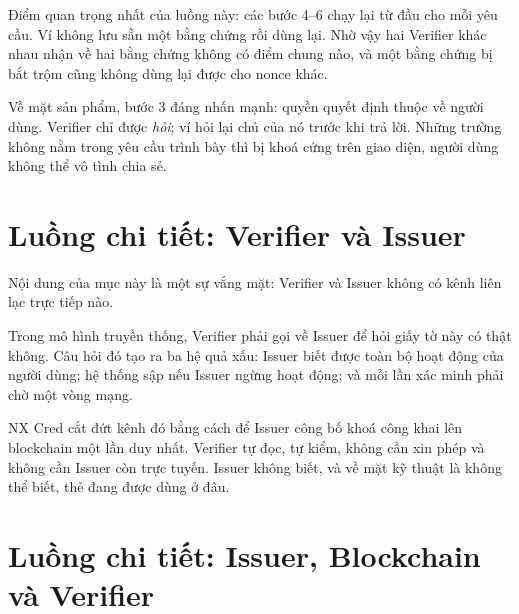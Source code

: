 \documentclass[a4paper,11pt,oneside]{report}
\theoremstyle{definition}
\theoremstyle{plain}
\begin{document}
Điểm quan trọng nhất của luồng này: các bước 4--6 chạy lại từ đầu cho mỗi yêu cầu. Ví không lưu
sẵn một bằng chứng rồi dùng lại. Nhờ vậy hai Verifier khác nhau nhận về hai bằng
chứng không có điểm chung nào, và một bằng chứng bị bắt trộm cũng không dùng lại được cho
nonce khác.

Về mặt sản phẩm, bước 3 đáng nhấn mạnh: quyền quyết định thuộc về người dùng. Verifier chỉ được
\emph{hỏi}; ví hỏi lại chủ của nó trước khi trả lời. Những trường không nằm trong
yêu cầu trình bày thì bị khoá cứng trên giao diện, người dùng không thể vô tình chia
sẻ.

\section{Luồng chi tiết: Verifier và Issuer}
\label{sec:flow-vi}

Nội dung của mục này là một sự vắng mặt: Verifier và Issuer không có
kênh liên lạc trực tiếp nào.

\begin{center}
\end{center}

Trong mô hình truyền thống, Verifier phải gọi về Issuer để hỏi giấy tờ này có thật không. Câu hỏi
đó tạo ra ba hệ quả xấu: Issuer biết được toàn bộ hoạt động của người dùng; hệ thống sập nếu
Issuer ngừng hoạt động; và mỗi lần xác minh phải chờ một vòng mạng.

NX Cred cắt đứt kênh đó bằng cách để Issuer công bố khoá công khai lên
blockchain một lần duy nhất. Verifier tự đọc, tự kiểm, không cần xin phép và
không cần Issuer còn trực tuyến. Issuer không biết, và về mặt kỹ thuật là không thể biết, thẻ
đang được dùng ở đâu.

\section{Luồng chi tiết: Issuer, Blockchain và Verifier}
\label{sec:flow-ibv}
\end{document}
